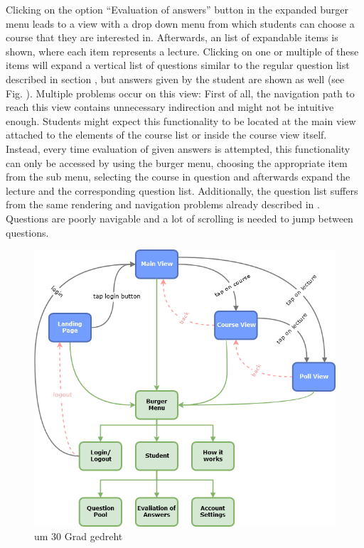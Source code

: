Clicking on the option “Evaluation of answers” button in the expanded burger menu leads to a view with a drop down menu from which students can choose a course that they are interested in. Afterwards, an list of expandable items is shown, where each item represents a lecture. Clicking on one or multiple of these items will expand a vertical list of questions similar to  the regular question list described in section \todosct, but answers given by the student are shown as well (see Fig. \todosct).
Multiple problems occur on this view: First of all, the navigation path to reach this view contains unnecessary indirection and might not be intuitive enough. Students might expect this functionality to be located at the main view attached to the elements of the course list or inside the course view itself. Instead, every time evaluation of given answers is attempted, this functionality can only be accessed by using the burger menu, choosing the appropriate item from the sub menu, selecting the course in question and afterwards expand the lecture and the corresponding question list.
Additionally, the question list suffers from the same rendering and navigation problems already described in \todosct. Questions are poorly navigable and a lot of scrolling is needed to jump between questions.



\begin{figure}[ht]
	\centering
	\includegraphics[width=\textwidth]{diagrams/amcs-click-paths.png}
	\caption{um 30 Grad gedreht}
	\label{fig1}
\end{figure}
